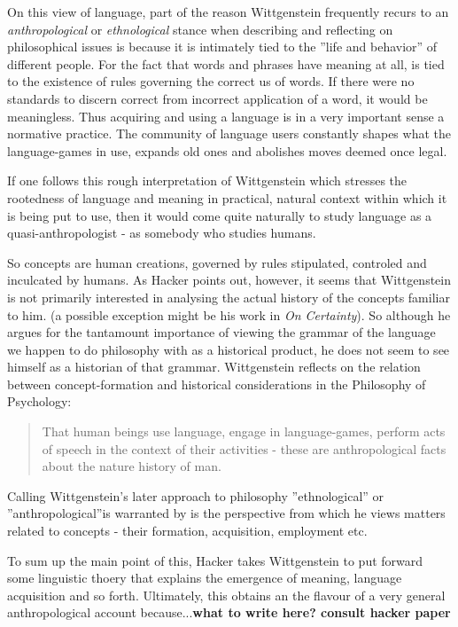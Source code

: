 \documentclass{article}
\begin{document}
On this view of language, part of the reason Wittgenstein frequently recurs to an \textit{anthropological} or \textit{ethnological} stance when describing and reflecting on philosophical issues is because it is intimately tied to the ''life and behavior'' of different people. For the fact that words and phrases have meaning at all, is tied to the existence of rules governing the correct us of words. If there were no standards to discern correct from incorrect application of a word, it would be meaningless. 
Thus acquiring and using a language is in a very important sense a normative practice. The community of language users constantly shapes what the language-games in use, expands old ones and abolishes moves deemed once legal.

If one follows this rough interpretation of Wittgenstein which stresses the rootedness of language and meaning in practical, natural context within which it is being put to use, then it would come quite naturally to study language as a quasi-anthropologist - as somebody who studies humans.

So concepts are human creations, governed by rules stipulated, controled and inculcated by humans. As Hacker points out, however, it seems that Wittgenstein is not primarily interested in analysing the actual history of the concepts familiar to him. (a possible exception might be his work in \textit{On Certainty}). So although he argues for the tantamount importance of viewing the grammar of the language we happen to do philosophy with as a historical product, he does not seem to see himself as a historian of that grammar.
Wittgenstein reflects on the relation between concept-formation and historical considerations in the Philosophy of Psychology:
\begin{quote}
That human beings use language, engage in language-games, perform acts of speech in the context of their activities - these are anthropological facts about the nature history of man.
\end{quote}
 Calling Wittgenstein's later approach to philosophy ''ethnological'' or ''anthropological''is warranted by is the perspective from which he views matters related to concepts - their formation, acquisition, employment etc.

To sum up the main point of this, Hacker takes Wittgenstein to put forward some linguistic thoery that explains the emergence of meaning, language acquisition and so forth. Ultimately, this obtains an the flavour of a very general anthropological account because...\textbf{what to write here? consult hacker paper}
\end{document}
